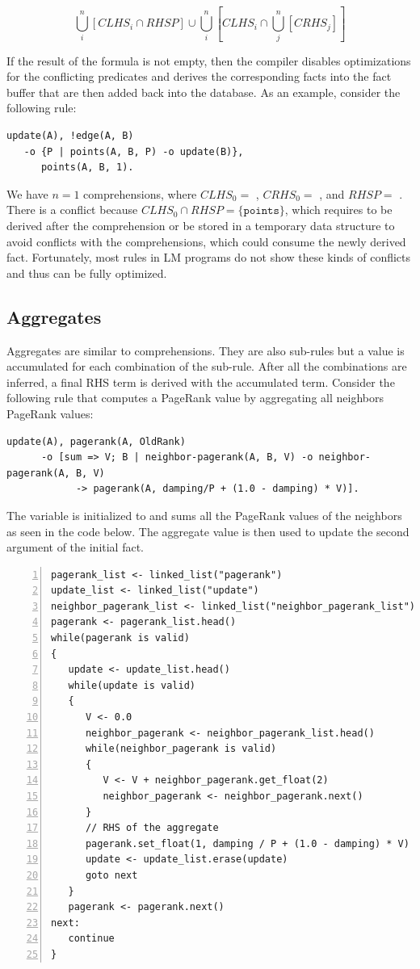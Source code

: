 \[
\bigcup^{n}_i[CLHS_i \cap RHSP] \cup \bigcup^{n}_i [CLHS_i \cap \bigcup^{n}_j[CRHS_j]]
\]

If the result of the formula is not empty, then the compiler disables
optimizations for the conflicting predicates and derives the corresponding facts
into the fact buffer that are then added back into the database. As an example,
consider the following rule:

\begin{Verbatim}[fontsize=\codesize]
update(A), !edge(A, B)
   -o {P | points(A, B, P) -o update(B)},
      points(A, B, 1).
\end{Verbatim}

We have $n = 1$ comprehensions, where $CLHS_0 = $ ,
$CRHS_0 =$ , and $RHSP = $ . There is a
conflict because $CLHS_0 \cap RHSP = \{\mathtt{points}\}$, which requires
 to be derived after the comprehension or be stored in a
temporary data structure to avoid conflicts with the comprehensions, which could
consume the newly derived fact. Fortunately, most rules in LM programs do not
show these kinds of conflicts and thus can be fully optimized.

\subsection{Aggregates}

Aggregates are similar to comprehensions. They are also sub-rules but a value is
accumulated for each combination of the sub-rule. After all the combinations are
inferred, a final RHS term is derived with the accumulated term. Consider the
following rule that computes a PageRank value by aggregating all neighbors
PageRank values:

\begin{Verbatim}[fontsize=\codesize]
update(A), pagerank(A, OldRank)
      -o [sum => V; B | neighbor-pagerank(A, B, V) -o neighbor-pagerank(A, B, V)
            -> pagerank(A, damping/P + (1.0 - damping) * V)].
\end{Verbatim}

The variable  is initialized to  and sums all the PageRank
values of the neighbors as seen in the code below. The aggregate value is then
used to update the second argument of the initial  fact.

\begin{Verbatim}[numbers=left,fontsize=\codesize]
pagerank_list <- linked_list("pagerank")
update_list <- linked_list("update")
neighbor_pagerank_list <- linked_list("neighbor_pagerank_list")
pagerank <- pagerank_list.head()
while(pagerank is valid)
{
   update <- update_list.head()
   while(update is valid)
   {
      V <- 0.0
      neighbor_pagerank <- neighbor_pagerank_list.head()
      while(neighbor_pagerank is valid)
      {
         V <- V + neighbor_pagerank.get_float(2)
         neighbor_pagerank <- neighbor_pagerank.next()
      }
      // RHS of the aggregate
      pagerank.set_float(1, damping / P + (1.0 - damping) * V)
      update <- update_list.erase(update)
      goto next
   }
   pagerank <- pagerank.next()
next:
   continue
}
\end{Verbatim}

